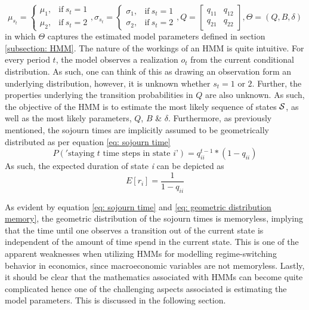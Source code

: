 $$
    \mu_{s_t}=
    \begin{cases}
        \mu_1, & \text{if}\ s_t = 1 \\
        \mu_2, & \text{if}\ s_t = 2
    \end{cases},
    \sigma_{s_t} =
    \begin{cases}
        \sigma_1, & \text{if}\ s_t = 1 \\
        \sigma_2, & \text{if}\ s_t = 2
    \end{cases},
    Q = 
    \begin{bmatrix}
    q_{11} & q_{12} \\
    q_{21} & q_{22}
    \end{bmatrix},
    \Theta = (Q, B, \delta)
$$
in which $\Theta$ captures the estimated model parameters defined in section \ref{subsection: HMM}. The nature of the workings of an HMM is quite intuitive. For every period $t$, the model observes a realization $o_t$ from the current conditional distribution. As such, one can think of this as drawing an observation form an underlying distribution, however, it is unknown whether $s_t = 1$ or $2$. Further, the properties underlying the transition probabilities in $Q$ are also unknown. As such, the objective of the HMM is to estimate the most likely sequence of states $\S$, as well as the most likely parameters, $Q$, $B$ \& $\delta$. Furthermore, as previously mentioned, the sojourn times are implicitly assumed to be geometrically distributed as per equation \ref{eq: sojourn time}
\begin{equation}
    P('\text{staying $t$ time steps in state $i$'}) = q^{t-1}_{ii} *(1-q_{ii})
    \label{eq: sojourn time}
\end{equation}
As such, the expected duration of state \textit{i} can be depicted as 
\begin{equation}
    E[r_i] = \frac{1}{1-q_{ii}}
    \label{eq: geometric distribution memory}
\end{equation}

As evident by equation \ref{eq: sojourn time} and \ref{eq: geometric distribution memory}, the geometric distribution of the sojourn times is memoryless, implying that the time until one observes a transition out of the current state is independent of the amount of time spend in the current state. This is one of the apparent weaknesses when utilizing HMMs for modelling regime-switching behavior in economics, since macroeconomic variables are not memoryless. Lastly, it should be clear that the mathematics associated with HMMs can become quite complicated hence one of the challenging aspects associated is estimating the model parameters. This is discussed in the following section.

